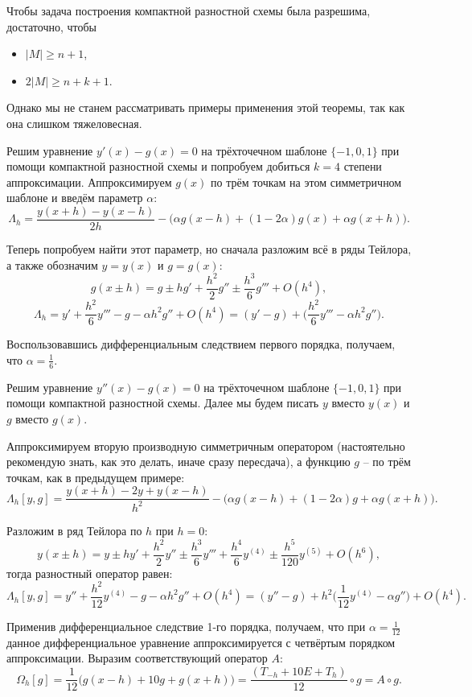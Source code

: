 \documentclass[../main.tex]{subfile}
\begin{document}
\begin{remark}
	Чтобы задача построения компактной разностной схемы была разрешима,
	достаточно, чтобы
	\begin{itemize}[nosep]
		\item $|M|\ge n+1$,
		\item $2|M|\ge n+k+1$.
	\end{itemize}
\end{remark}

Однако мы не станем рассматривать примеры применения этой теоремы, так как она
слишком тяжеловесная.

\begin{example}
	Решим уравнение $y'(x)-g(x)=0$ на трёхточечном шаблоне $\{-1,0,1\}$ при
	помощи компактной разностной схемы и попробуем добиться $k=4$ степени
	аппроксимации. Аппроксимируем $g(x)$ по трём точкам на этом симметричном
	шаблоне и введём параметр $\alpha$:
	\[\Lambda_h=\frac{y(x+h)-y(x-h)}{2h}-\big(\alpha g(x-h)+(1-2\alpha)g(x)+
	\alpha g(x+h)\big).\]

	Теперь попробуем найти этот параметр, но сначала разложим всё в ряды
	Тейлора, а также обозначим $y=y(x)$ и $g=g(x)$:
	\[g(x\pm h)=g\pm hg'+\frac{h^2}{2}g''\pm\frac{h^3}{6}g'''+O(h^4),\]
	\[\Lambda_h=y'+\frac{h^2}{6}y'''-g-\alpha h^2g''+O(h^4)=
	(y'-g)+\Big(\frac{h^2}{6}y'''-\alpha h^2g''\Big).\]

	Воспользовавшись дифференциальным следствием первого порядка, получаем,
	что $\alpha=\frac{1}{6}$.
\end{example}
\newpage

\begin{example}
	Решим уравнение $y''(x)-g(x)=0$ на трёхточечном шаблоне $\{-1,0,1\}$
	при помощи компактной разностной схемы. Далее мы будем писать $y$ вместо
	$y(x)$ и $g$ вместо $g(x)$.

	Аппроксимируем вторую производную симметричным оператором (настоятельно
	рекомендую знать, как это делать, иначе сразу пересдача), а функцию
	$g$ -- по трём точкам, как в предыдущем примере:
	\[\Lambda_h[y,g]=\frac{y(x+h)-2y+y(x-h)}{h^2}-\big(\alpha g(x-h)+
	(1-2\alpha)g+\alpha g(x+h)\big).\]

	Разложим в ряд Тейлора по $h$ при $h=0$:
	\[y(x\pm h)=y\pm hy'+\frac{h^2}{2}y''\pm \frac{h^3}{6}y'''+\frac{h^4}{6}
	y^{(4)}\pm\frac{h^5}{120}y^{(5)}+O(h^6),\]
	тогда разностный оператор равен:
	\[\Lambda_h[y,g]=y''+\frac{h^2}{12}y^{(4)}-g-\alpha h^2g''+O(h^4)=
	(y''-g)+h^2\big(\frac{1}{12}y^{(4)}-\alpha g''\big)+O(h^4).\]

	Применив дифференциальное следствие 1-го порядка, получаем, что при
	$\alpha=\frac{1}{12}$ данное дифференциальное уравнение аппроксимируется
	с четвёртым порядком аппроксимации. Выразим соответствующий оператор $A$:
	\[\Omega_h[g]=\frac{1}{12}\big(g(x-h)+10g+g(x+h)\big)=
	\frac{(T_{-h}+10E+T_h)}{12}\circ g=A\circ g.\]
\end{example}
\end{document}
